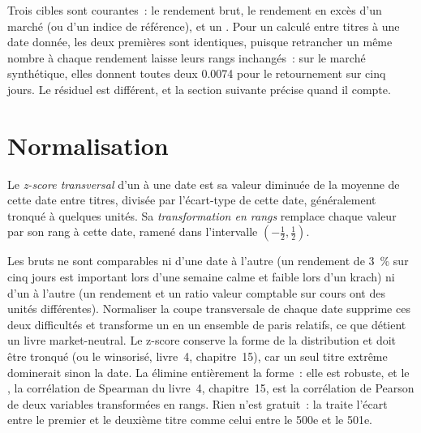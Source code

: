 Trois cibles sont courantes~: le rendement brut, le rendement en excès d'un marché (ou d'un indice de référence), et un . Pour un 
calculé entre titres à une date donnée, les deux premières sont identiques, puisque retrancher un même nombre à chaque rendement laisse
leurs rangs inchangés~: sur le marché synthétique, elles donnent toutes deux 0.0074 pour le retournement sur cinq jours. Le résiduel est différent, et la
section suivante précise quand il compte.

\section{Normalisation}

\begin{definition}\label{def:rs:anatomy-of-a-predictor:normalise}
Le \emph{z-score transversal} d'un  à une date est sa valeur diminuée de la moyenne de cette date
entre titres, divisée par l'écart-type de cette date, généralement tronqué à quelques unités. Sa \emph{transformation en
rangs} remplace chaque valeur par son rang à cette date, ramené dans l'intervalle $(-\tfrac12, \tfrac12)$.
\end{definition}

Les  bruts ne sont comparables ni d'une date à l'autre (un rendement de 3~\% sur cinq jours est important lors d'une semaine calme et faible lors d'un krach)
ni d'un  à l'autre (un rendement et un ratio valeur comptable sur cours ont des unités différentes). Normaliser la coupe transversale de chaque date
supprime ces deux difficultés et transforme un  en un ensemble de paris relatifs, ce que détient un livre market-neutral. Le
z-score conserve la forme de la distribution et doit être tronqué (ou le  winsorisé, livre~4, chapitre~15), car un
seul titre extrême dominerait sinon la date. La  élimine entièrement la forme~: elle est robuste, et le ,
la corrélation de Spearman du livre~4, chapitre~15, est la corrélation de Pearson de deux variables transformées en rangs. Rien n'est gratuit~:
la  traite l'écart entre le premier et le deuxième titre comme celui entre le 500e et le 501e.

